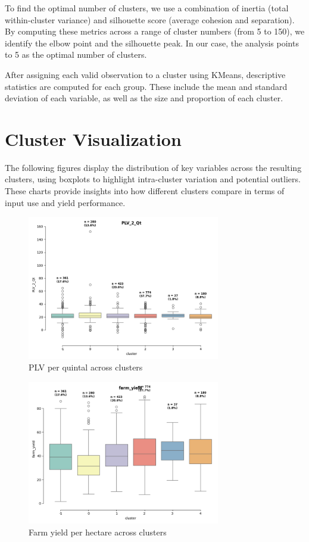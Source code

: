 \documentclass[a4paper,12pt]{article}
\begin{document}
To find the optimal number of clusters, we use a combination of inertia (total within-cluster variance) and silhouette score (average cohesion and separation). By computing these metrics across a range of cluster numbers (from 5 to 150), we identify the elbow point and the silhouette peak. In our case, the analysis points to 5 as the optimal number of clusters.

After assigning each valid observation to a cluster using KMeans, descriptive statistics are computed for each group. These include the mean and standard deviation of each variable, as well as the size and proportion of each cluster.

\section{Cluster Visualization}

The following figures display the distribution of key variables across the resulting clusters, using boxplots to highlight intra-cluster variation and potential outliers. These charts provide insights into how different clusters compare in terms of input use and yield performance.

\begin{figure}[h!]
    \centering
    \includegraphics[width=0.75\textwidth]{clustering_pipeline/output/20250404_boxplot_PLV_2_Qt.png}
    \caption{PLV per quintal across clusters}
\end{figure}

\begin{figure}[h!]
    \centering
    \includegraphics[width=0.75\textwidth]{clustering_pipeline/output/20250404_boxplot_farm_yield.png}
    \caption{Farm yield per hectare across clusters}
\end{figure}
\end{document}
